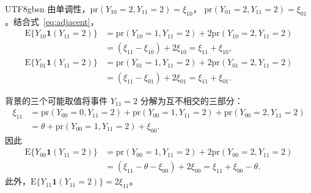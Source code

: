 \documentclass[11pt,a4paper]{article}
\theoremstyle{report}
\begin{document}
\begin{CJK*}{UTF8}{gbsn}
\clearpage
由单调性，$\mathrm{pr}(Y_{10}=2,Y_{11}=2)=\xi_{10}$，
$\mathrm{pr}(Y_{01}=2,Y_{11}=2)=\xi_{01}$。结合式~\eqref{eq:adjacent}，
\begin{equation}
\begin{aligned}
\mathrm E\{Y_{10}\mathbf1(Y_{11}=2)\}
 &=\mathrm{pr}(Y_{10}=1,Y_{11}=2)
     +2\mathrm{pr}(Y_{10}=2,Y_{11}=2)\\
 &=(\xi_{11}-\xi_{10})+2\xi_{10}
  =\xi_{11}+\xi_{10},\\[3pt]
\mathrm E\{Y_{01}\mathbf1(Y_{11}=2)\}
 &=\mathrm{pr}(Y_{01}=1,Y_{11}=2)
     +2\mathrm{pr}(Y_{01}=2,Y_{11}=2)\\
 &=(\xi_{11}-\xi_{01})+2\xi_{01}
  =\xi_{11}+\xi_{01}.
\end{aligned}
\label{eq:exposure-moments}
\end{equation}

背景的三个可能取值将事件 $Y_{11}=2$ 分解为互不相交的三部分：
\[
\begin{aligned}
\xi_{11}
 &=\mathrm{pr}(Y_{00}=0,Y_{11}=2)
   +\mathrm{pr}(Y_{00}=1,Y_{11}=2)
   +\mathrm{pr}(Y_{00}=2,Y_{11}=2)\\
 &=\theta+\mathrm{pr}(Y_{00}=1,Y_{11}=2)+\xi_{00}.
\end{aligned}
\]
因此
\begin{equation}
\begin{aligned}
\mathrm E\{Y_{00}\mathbf1(Y_{11}=2)\}
 &=\mathrm{pr}(Y_{00}=1,Y_{11}=2)
     +2\mathrm{pr}(Y_{00}=2,Y_{11}=2)\\
 &=(\xi_{11}-\theta-\xi_{00})+2\xi_{00}
  =\xi_{11}+\xi_{00}-\theta.
\end{aligned}
\label{eq:background-moment}
\end{equation}
此外，$\mathrm E\{Y_{11}\mathbf1(Y_{11}=2)\}=2\xi_{11}$。


\end{CJK*}
\end{document}
